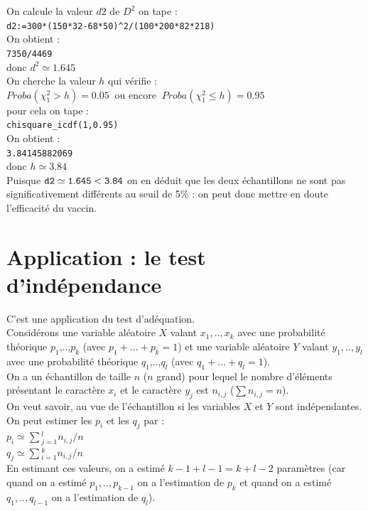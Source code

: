 \documentclass[a4paper,11pt]{book}
\begin{document}
On calcule la valeur $d2$ de $D^2$ on tape :\\
{\tt d2:=300*(150*32-68*50)\verb|^|2/(100*200*82*218)}\\
On obtient :\\
{\tt 7350/4469}\\
donc $d^2 \simeq 1.645$\\
On cherche la valeur $h$ qui v\'erifie :\\
$Proba(\chi_1^2>h)=0.05\ $ ou encore $\ Proba(\chi_1^2 \leq h)=0.95$\\
 pour cela on tape :\\
{\tt chisquare\_icdf(1,0.95)}\\
On obtient :\\
{\tt 3.84145882069}\\
donc $h \simeq 3.84$\\
Puisque ${\tt d2\simeq 1.645<3.84}$ on en d\'eduit que les deux \'echantillons
 ne sont pas significativement diff\'erents au seuil de 5\% : on peut donc 
mettre en doute  l'efficacit\'e du vaccin.
\section{Application : le test d'ind\'ependance}
C'est une application du test d'ad\'equation.\\
Consid\'erons une variable al\'eatoire $X$ valant $x_1,..,x_k$ avec une
 probabilit\'e th\'eorique $p_1$,..,$p_k$  (avec $p_1+...+p_k=1$) et une variable 
al\'eatoire $Y$ valant $y_1,..,y_l$ avec une
 probabilit\'e th\'eorique $q_1$,..,$q_l$  (avec $q_1+...+q_l=1$).\\
On a un \'echantillon de taille $n$ ($n$ grand) pour lequel le nombre
 d'\'el\'ements pr\'esentant le caract\`ere $x_i$ et le caract\`ere $y_j$ est 
$n_{i,j}$ ($\sum n_{i,j}=n$).\\
On veut savoir, au vue de l'\'echantillon si les variables $X$ et $Y$ sont ind\'ependantes.\\
On peut estimer les $p_i$ et les $q_j$ par :\\
$p_i \simeq \sum{}_{j=1}^l  n_{i,j}/n$\\
$q_j \simeq \sum{}_{i=1}^k  n_{i,j}/n$\\
En estimant ces valeurs, on a estim\'e $k-1+l-1=k+l-2$ param\`etres (car quand 
on a estim\'e $p_1,..,p_{k-1}$ on a l'estimation de $p_k$ et quand on 
a estim\'e $q_1,..,q_{l-1}$ on a l'estimation de $q_l$).
\end{document}
